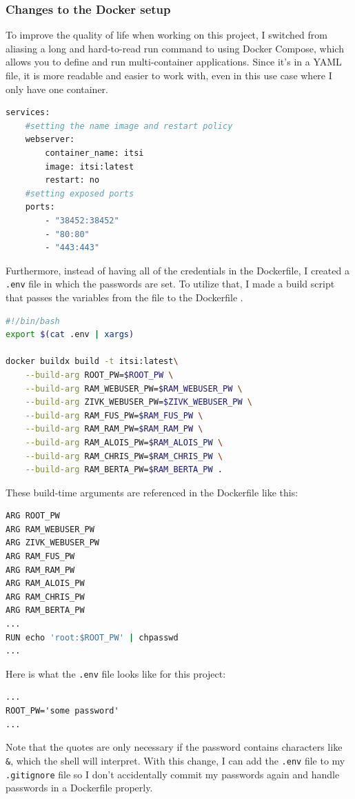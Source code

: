 \documentclass[a4paper]{article}
\begin{document}
\subsubsection{Changes to the Docker setup}
To improve the quality of life when working on this project, I switched from aliasing a long and hard-to-read run command to using Docker Compose, which allows you to define and run multi-container applications. Since it's in a YAML file, it is more readable and easier to work with, even in this use case where I only have one container.\cite{Docker-Compose}
\begin{lstlisting}[language=bash]
services:
    #setting the name image and restart policy
    webserver:
        container_name: itsi
        image: itsi:latest
        restart: no
    #setting exposed ports
    ports:
        - "38452:38452"
        - "80:80"
        - "443:443"
\end{lstlisting}
Furthermore, instead of having all of the credentials in the Dockerfile, I created a \texttt{.env} file in which the passwords are set. To utilize that, I made a build script that passes the variables from the file to the Dockerfile \cite{docker-arg}.
\begin{lstlisting}[language=bash]
#!/bin/bash
export $(cat .env | xargs)

docker buildx build -t itsi:latest\
	--build-arg ROOT_PW=$ROOT_PW \
	--build-arg RAM_WEBUSER_PW=$RAM_WEBUSER_PW \
	--build-arg ZIVK_WEBUSER_PW=$ZIVK_WEBUSER_PW \
	--build-arg RAM_FUS_PW=$RAM_FUS_PW \
	--build-arg RAM_RAM_PW=$RAM_RAM_PW \
	--build-arg RAM_ALOIS_PW=$RAM_ALOIS_PW \
	--build-arg RAM_CHRIS_PW=$RAM_CHRIS_PW \
	--build-arg RAM_BERTA_PW=$RAM_BERTA_PW .
\end{lstlisting}
These build-time arguments are referenced in the Dockerfile like this:
\begin{lstlisting}[language=bash]
ARG ROOT_PW
ARG RAM_WEBUSER_PW
ARG ZIVK_WEBUSER_PW
ARG RAM_FUS_PW
ARG RAM_RAM_PW
ARG RAM_ALOIS_PW
ARG RAM_CHRIS_PW
ARG RAM_BERTA_PW
...
RUN echo 'root:$ROOT_PW' | chpasswd
...
\end{lstlisting}
Here is what the \texttt{.env} file looks like for this project:
\begin{lstlisting}
...
ROOT_PW='some password'
...
\end{lstlisting}
Note that the quotes are only necessary if the password contains characters like \texttt{\&}, which the shell will interpret.
With this change, I can add the \texttt{.env} file to my \texttt{.gitignore} file so I don't accidentally commit my passwords again and handle passwords in a Dockerfile properly.
\end{document}
